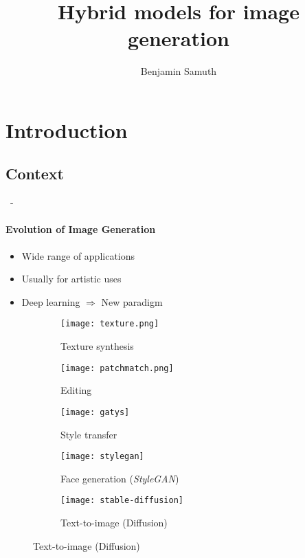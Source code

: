 \documentclass[aspectratio=169, 22pt]{beamer}
\title[Hybrid models for image generation]{Hybrid models for image generation}
\subtitle{}
\author[Benjamin Samuth]{Benjamin Samuth}
\institute[Normandie University]{Normandie Univ, UNICAEN, ENSICAEN, CNRS, GREYC, Caen, FRANCE}
\begin{document}
\begin{frame}
  \titlepage
\end{frame}

\section{Introduction}

\subsection{Context}
\begin{frame}{\secname~- \subsecname}
  \framesubtitle{Evolution of Image Generation}
      \begin{itemize}
      \item Wide range of applications
      \item Usually for artistic uses
      \item Deep learning $\Rightarrow$ \alert{New paradigm}
      \end{itemize}
      
      \begin{figure}
        \captionsetup[subfigure]{labelformat=empty}
        \centering
        \begin{subfigure}[t]{0.19\linewidth}\centering
          \texttt{[image: texture.png]}
          \caption{{\scriptsize Texture synthesis \newline {\tiny [Ashikhmin et al., 2001]}}}
        \end{subfigure}
        \begin{subfigure}[t]{0.19\linewidth}\centering
          \texttt{[image: patchmatch.png]}
          \caption{{\footnotesize Editing \newline {\scriptsize [Barnes et al., 2009]}}}
        \end{subfigure}        
        \begin{subfigure}[t]{0.19\linewidth}\centering
          \texttt{[image: gatys]}
          \caption{{\footnotesize Style transfer \newline {\scriptsize [Gatys et al., 2016]}}}
        \end{subfigure}
        \begin{subfigure}[t]{0.19\linewidth}\centering
          \texttt{[image: stylegan]}
          \caption{{\footnotesize Face generation (\emph{StyleGAN}) \newline {\scriptsize [Karras et al., 2019]}}}
        \end{subfigure}        
        \begin{subfigure}[t]{0.19\linewidth}\centering
          \texttt{[image: stable-diffusion]}
          \caption{{\footnotesize Text-to-image (Diffusion) \newline {\tiny [Rombach et al., 2022]}}}
        \end{subfigure}
      \end{figure}
\end{frame}
\end{document}
